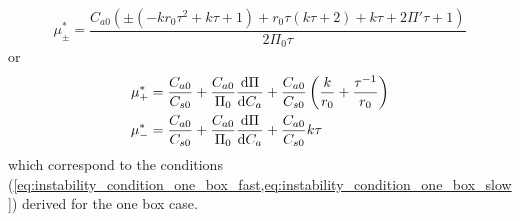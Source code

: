 \begin{equation}
  \label{eq:mu_zero_one}
  \mu^*_{\pm} = \frac{C_{a0} \left(\pm\left(-k r_0 \tau ^2+k \tau +1\right)+r_0 \tau  (k \tau +2)+k \tau +2 \Pi' \tau +1\right)}{2 \Pi_0 \tau}
\end{equation}
or
\begin{align}
  \label{eq:mu_zero_one_cases}
  \mu_+^* &= \frac{C_{a0}}{C_{s0}} + \frac{C_{a0}}{\Pi_0}\dv{\Pi}{C_a} + \frac{C_{a0}}{C_{s0}} \left(\frac{k}{r_0} + \frac{\tau^{-1}}{r_0}\right) \\
  \mu_-^* &= \frac{C_{a0}}{C_{s0}} + \frac{C_{a0}}{\Pi_0}\dv{\Pi}{C_a} + \frac{C_{a0}}{C_{s0}}k\tau 
\end{align}
which correspond to the conditions (\cref{eq:instability_condition_one_box_fast,eq:instability_condition_one_box_slow}) derived for the one box case.
